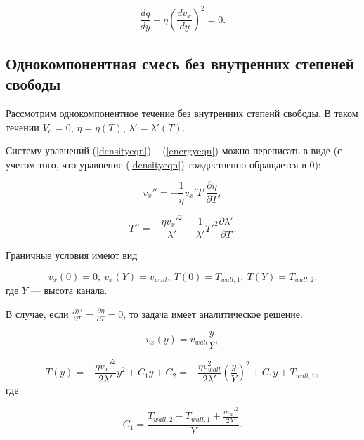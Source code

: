 \documentclass[12pt]{article}
\begin{document}
\begin{equation}
  \frac{d q}{d y} - \eta \left(\frac{d v_{x}}{d y} \right)^2 = 0.\label{energyeqn}
\end{equation}

\subsection{Однокомпонентная смесь без внутренних степеней свободы}
Рассмотрим однокомпонентное течение без внутренних степенй свободы.
В таком течении $V_{c}$ = 0, $\eta=\eta(T)$, $\lambda'=\lambda'(T)$.

Систему уравнений (\ref{densityeqn}) -- (\ref{energyeqn}) можно переписать в виде (с учетом того, что уравнение (\ref{densityeqn}) тождественно обращается в 0):

\begin{equation}
  v_{x}'' = -\frac{1}{\eta} v_{x}' T' \frac{\partial \eta}{\partial T},\label{eqn-dimensional-d2v}
\end{equation}

\begin{equation}
   T'' = -\frac{\eta v_{x}'^2}{\lambda'}
  - \frac{1}{\lambda'} T'^2 \frac{\partial \lambda'}{\partial T}.\label{eqn-dimensional-d2T}
\end{equation}

Граничные условия имеют вид

\begin{equation}
  v_{x}(0) = 0,\:v_{x}(Y) = v_{wall},\:T(0) = T_{wall,1},\:T(Y) = T_{wall,2}.
\end{equation}
где $Y$ --- высота канала.

В случае, если $\frac{\partial \lambda'}{\partial T} = \frac{\partial \eta}{\partial T} = 0$, то задача имеет аналитическое решение:

\begin{equation}
  v_{x}(y) = v_{wall}\frac{y}{Y},
\end{equation}

\begin{equation}
  T(y) = -\frac{\eta v_{x}'^2}{2\lambda'}y^2 + C_{1}y + C_{2} = -\frac{\eta v_{wall}^2}{2\lambda'}\left(\frac{y}{Y}\right)^2 + C_{1}y + T_{wall,1},
\end{equation}
где

\begin{equation}
  C_{1}= \frac{T_{wall,2} - T_{wall,1} +\frac{\eta v_{x}'^2}{2\lambda'}}{Y}.
\end{equation}
\end{document}
